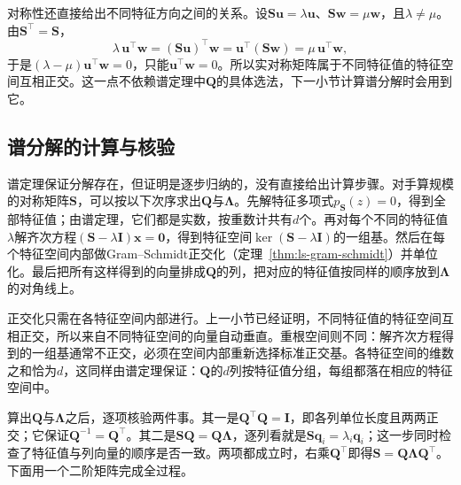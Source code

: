 对称性还直接给出不同特征方向之间的关系。设$\bm S\bm u=\lambda\bm u$、$\bm S\bm w=\mu\bm w$，且$\lambda\neq\mu$。由$\bm S^\top=\bm S$，
\[
 \lambda\,\bm u^\top\bm w=(\bm S\bm u)^\top\bm w=\bm u^\top(\bm S\bm w)=\mu\,\bm u^\top\bm w ,
\]
于是$(\lambda-\mu)\bm u^\top\bm w=0$，只能$\bm u^\top\bm w=0$。所以实对称矩阵属于不同特征值的特征空间互相正交。这一点不依赖谱定理中$\bm Q$的具体选法，下一小节计算谱分解时会用到它。

\subsection{谱分解的计算与核验}
\label{sec:ls-spectral-decomposition-computation}

谱定理保证分解存在，但证明是逐步归纳的，没有直接给出计算步骤。对手算规模的对称矩阵$\bm S$，可以按以下次序求出$\bm Q$与$\bm\Lambda$。先解特征多项式$p_{\bm S}(z)=0$，得到全部特征值；由谱定理，它们都是实数，按重数计共有$d$个。再对每个不同的特征值$\lambda$解齐次方程$(\bm S-\lambda\bm I)\bm x=\bm0$，得到特征空间$\ker(\bm S-\lambda\bm I)$的一组基。然后在每个特征空间内部做Gram--Schmidt正交化（定理~\ref{thm:ls-gram-schmidt}）并单位化。最后把所有这样得到的向量排成$\bm Q$的列，把对应的特征值按同样的顺序放到$\bm\Lambda$的对角线上。

正交化只需在各特征空间内部进行。上一小节已经证明，不同特征值的特征空间互相正交，所以来自不同特征空间的向量自动垂直。重根空间则不同：解齐次方程得到的一组基通常不正交，必须在空间内部重新选择标准正交基。各特征空间的维数之和恰为$d$，这同样由谱定理保证：$\bm Q$的$d$列按特征值分组，每组都落在相应的特征空间中。

算出$\bm Q$与$\bm\Lambda$之后，逐项核验两件事。其一是$\bm Q^\top\bm Q=\bm I$，即各列单位长度且两两正交；它保证$\bm Q^{-1}=\bm Q^\top$。其二是$\bm S\bm Q=\bm Q\bm\Lambda$，逐列看就是$\bm S\bm q_i=\lambda_i\bm q_i$；这一步同时检查了特征值与列向量的顺序是否一致。两项都成立时，右乘$\bm Q^\top$即得$\bm S=\bm Q\bm\Lambda\bm Q^\top$。下面用一个二阶矩阵完成全过程。

